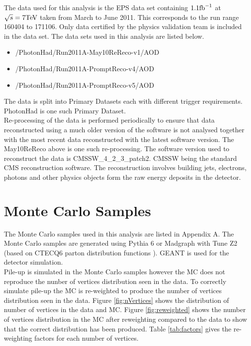 The data used for this analysis is the EPS data set containing $1.1 \mbox{fb}^{-1}$
at $\sqrt{s} = 7 \mbox{TeV}$ taken from March to June 2011. This corresponds to the
run range 160404 to 171106. Only data certified by the physics validation team
is included in the data set. The data sets used in this analysis are listed 
below.

\begin{itemize}
\item /PhotonHad/Run2011A-May10ReReco-v1/AOD %
\item /PhotonHad/Run2011A-PromptReco-v4/AOD %
\item /PhotonHad/Run2011A-PromptReco-v5/AOD %
\end{itemize}

The data is split into Primary Datasets each with different trigger
requirements. PhotonHad is one such Primary Dataset. \\

Re-processing of the data is performed periodically to ensure that data
reconstructed using a much older version of the software is not analysed
together with the most recent data reconstructed with the latest software
version. The May10ReReco above is one such re-processing. The software version
used to reconstruct the data is CMSSW\_4\_2\_3\_patch2. CMSSW being the standard
CMS reconstruction software. The reconstruction involves building jets, 
electrons, photons and other physics objects form the raw energy deposits in the
detector.

\section{Monte Carlo Samples}
\label{sec:Monte_Carlo_Samples}

The Monte Carlo samples used in this analysis are listed in Appendix A. The 
Monte Carlo samples are generated using Pythia 6 \cite{pythia6} or Madgraph
\cite{madgraph} with Tune Z2 (based on CTECQ6 parton distribution functions 
\cite{tuneZ2}). GEANT \cite{geant} is used for the detector simulation. \\

Pile-up is simulated in the Monte Carlo samples however the MC does not
reproduce the nunber of vertices distribution seen in the data. To correctly
simulate pile-up the MC is re-weighted to produce the number of vertices
distribution seen in the data. Figure \ref{fig:nVertices} shows the distribution
of number of vertices in the data and MC. Figure \ref{fig:reweighted} shows the
number of vertices distribution in the MC after reweighting compared to the data
to show that the correct distribution has been produced. Table \ref{tab:factors}
gives the re-weighting factors for each number of vertices. \\

